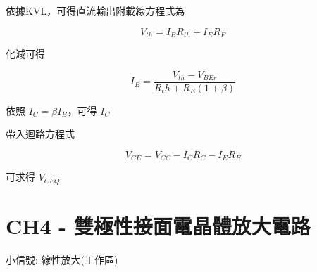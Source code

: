 \documentclass[
]{report}
\begin{document}
依據KVL，可得直流輸出附載線方程式為

\[
V_{th} = I_B R_{th} + I_E R_E
\]

化減可得

\[
I_B = \frac {V_{th} - V_{BEr}}{R_th + R_E(1 + \beta)}
\]

依照 \(I_C = \beta I_B\)，可得 \(I_C\)

帶入迴路方程式

\[
V_{CE} = V_{CC} - I_C R_C - I_E R_E
\]

可求得 \(V_{CEQ}\)

\hypertarget{ch4---ux96d9ux6975ux6027ux63a5ux9762ux96fbux6676ux9ad4ux653eux5927ux96fbux8def}{%
\chapter{CH4 -
雙極性接面電晶體放大電路}\label{ch4---ux96d9ux6975ux6027ux63a5ux9762ux96fbux6676ux9ad4ux653eux5927ux96fbux8def}}

小信號: 線性放大(工作區)
\end{document}
